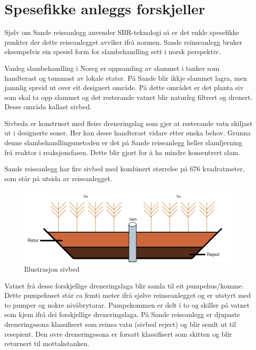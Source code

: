 \newpage
\section{Spesefikke anleggs forskjeller}
\thispagestyle{fancy}

Sjølv om Sande reiseanlegg anvender SBR-teknologi så er det enkle spesefikke
punkter der dette reiseanlegget avviker ifrå normen. 
Sande reinseanlegg bruker eksempelvis ein spesiel form for slambehandling sett i norsk perspektiv.

Vanleg slambehandling i Noreg er oppsamling av slammet i tanker som handterast og tømmast av lokale etater.
På Sande blir ikkje slammet lagra, men jamnlig spreid ut over eit designert område. På dette området er
det planta siv som skal ta opp slammet og det resterande vatnet blir naturleg filtrert og drenert.
Desse områda kallast sivbed.

Sivbeda er konstruert med fleire dreneringslag som gjer at resterande vatn skiljast ut i designerte soner.
Her kan desse handterast vidare etter ønska behov. 
Grunna denne slambehandlingsmetoden er det på Sande reiseanlegg heller slamfjerning frå reaktor
i reaksjonsfasen. Dette blir gjort for å ha mindre konsentrert slam.

Sande reiseanlegg har fire sivbed med kombinert størrelse på 676 kvadratmeter, som står på utsida av reiseanlegget.


\begin{figure}[htbp]
    \centering
    \includegraphics[width=1\textwidth]{Figurar/Sivbed.png}
    \caption{Illustrasjon sivbed}\label{fig:HMI}
\end{figure}


\newpage

Vatnet frå desse forskjellige dreneringslaga blir samla til eit pumpehus/komme.
Dette pumpehuset står ca femti meter ifrå sjølve reinseanlegget og er utstyrt med to pumper og nokre nivåbrytarar.
Pumpekommen er delt i to og skiller på vatnet som kjem ifrå dei forskjellige dreneringslaga. \newline
På Sande reiseanlegg er djupaste dreneringssona klassifisert som reinsa vatn (sivbed reject) og blir sendt ut til resepient.
Den øvre dreneringssona er forsatt klassifisert som skitten og blir returnert til mottakstanken.

